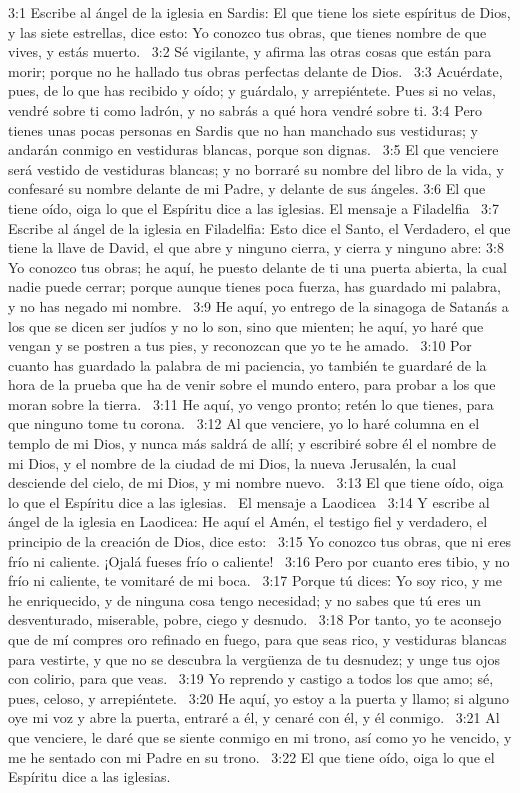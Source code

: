 3:1 Escribe al ángel de la iglesia en Sardis: El que tiene los siete espíritus de Dios, y las siete estrellas, dice esto: Yo conozco tus obras, que tienes nombre de que vives, y estás muerto.  
3:2 Sé vigilante, y afirma las otras cosas que están para morir; porque no he hallado tus obras perfectas delante de Dios.  
3:3 Acuérdate, pues, de lo que has recibido y oído; y guárdalo, y arrepiéntete. Pues si no velas, vendré sobre ti como ladrón, y no sabrás a qué hora vendré sobre ti. 
3:4 Pero tienes unas pocas personas en Sardis que no han manchado sus vestiduras; y andarán conmigo en vestiduras blancas, porque son dignas.  
3:5 El que venciere será vestido de vestiduras blancas; y no borraré su nombre del libro de la vida, y confesaré su nombre delante de mi Padre, y delante de sus ángeles. 
3:6 El que tiene oído, oiga lo que el Espíritu dice a las iglesias. 
El mensaje a Filadelfia  
3:7 Escribe al ángel de la iglesia en Filadelfia: Esto dice el Santo, el Verdadero, el que tiene la llave de David, el que abre y ninguno cierra, y cierra y ninguno abre: 
3:8 Yo conozco tus obras; he aquí, he puesto delante de ti una puerta abierta, la cual nadie puede cerrar; porque aunque tienes poca fuerza, has guardado mi palabra, y no has negado mi nombre.  
3:9 He aquí, yo entrego de la sinagoga de Satanás a los que se dicen ser judíos y no lo son, sino que mienten; he aquí, yo haré que vengan y se postren a tus pies, y reconozcan que yo te he amado.  
3:10 Por cuanto has guardado la palabra de mi paciencia, yo también te guardaré de la hora de la prueba que ha de venir sobre el mundo entero, para probar a los que moran sobre la tierra.  
3:11 He aquí, yo vengo pronto; retén lo que tienes, para que ninguno tome tu corona.  
3:12 Al que venciere, yo lo haré columna en el templo de mi Dios, y nunca más saldrá de allí; y escribiré sobre él el nombre de mi Dios, y el nombre de la ciudad de mi Dios, la nueva Jerusalén, la cual desciende del cielo, de mi Dios, y mi nombre nuevo.  
3:13 El que tiene oído, oiga lo que el Espíritu dice a las iglesias.  
El mensaje a Laodicea  
3:14 Y escribe al ángel de la iglesia en Laodicea: He aquí el Amén, el testigo fiel y verdadero, el principio de la creación de Dios, dice esto:  
3:15 Yo conozco tus obras, que ni eres frío ni caliente. ¡Ojalá fueses frío o caliente!  
3:16 Pero por cuanto eres tibio, y no frío ni caliente, te vomitaré de mi boca.  
3:17 Porque tú dices: Yo soy rico, y me he enriquecido, y de ninguna cosa tengo necesidad; y no sabes que tú eres un desventurado, miserable, pobre, ciego y desnudo.  
3:18 Por tanto, yo te aconsejo que de mí compres oro refinado en fuego, para que seas rico, y vestiduras blancas para vestirte, y que no se descubra la vergüenza de tu desnudez; y unge tus ojos con colirio, para que veas.  
3:19 Yo reprendo y castigo a todos los que amo; sé, pues, celoso, y arrepiéntete.  
3:20 He aquí, yo estoy a la puerta y llamo; si alguno oye mi voz y abre la puerta, entraré a él, y cenaré con él, y él conmigo.  
3:21 Al que venciere, le daré que se siente conmigo en mi trono, así como yo he vencido, y me he sentado con mi Padre en su trono.  
3:22 El que tiene oído, oiga lo que el Espíritu dice a las iglesias.  
